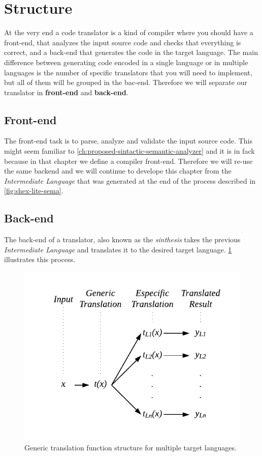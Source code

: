 \section{Structure}
At the very end a code translator is a kind of compiler where you should have a front-end, that
analyzes the input source code and checks that everything is correct, and a back-end that
generates the code in the target language. The main difference between generating code encoded
in a single language or in multiple languages is the number of specific translators that you will need to
implement, but all of them will be grouped in the bac-end. Therefore we will separate our
translator in \textbf{front-end} and \textbf{back-end}.

\subsection{Front-end}
The front-end task is to parse, analyze and validate the input source code. This might seem familiar to
\cref{ch:proposed-sintactic-semantic-analyzer} and it is in fack because in that chapter we define
a compiler front-end. Therefore we will re-use the same backend and we will continue to develope this
chapter from the \textit{Intermediate Language} that was generated at the end of the process described in
\cref{fig:shex-lite-sema}.

\subsection{Back-end}
The back-end of a translator, also known as the \textit{sinthesis} takes the previous \textit{Intermediate Language}
and translates it to the desired target language. \cref{fig:translation-function} illustrates this process.

\begin{figure}
    \includegraphics{images/translation-function.pdf}
    \centering
	\caption[Generic translation function structure]{Generic translation function structure for multiple
	target languages.}
    \label{fig:translation-function}
\end{figure}

